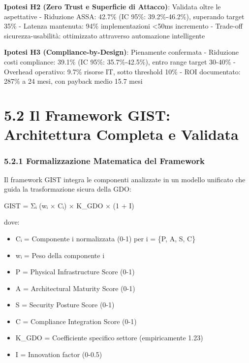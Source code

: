 \documentclass{report}
\providecommand{\tightlist}{%
  \setlength{\itemsep}{0pt}\setlength{\parskip}{0pt}
}
\begin{document}
\textbf{Ipotesi H2 (Zero Trust e Superficie di Attacco)}: Validata oltre
le aspettative - Riduzione ASSA: 42.7\% (IC 95\%: 39.2\%-46.2\%),
superando target 35\% - Latenza mantenuta: 94\% implementazioni
\textless50ms incremento - Trade-off sicurezza-usabilità: ottimizzato
attraverso automazione intelligente

\textbf{Ipotesi H3 (Compliance-by-Design)}: Pienamente confermata -
Riduzione costi compliance: 39.1\% (IC 95\%: 35.7\%-42.5\%), entro range
target 30-40\% - Overhead operativo: 9.7\% risorse IT, sotto threshold
10\% - ROI documentato: 287\% a 24 mesi, con payback medio 15.7 mesi

\section{5.2 Il Framework GIST: Architettura Completa e
Validata}\label{il-framework-gist-architettura-completa-e-validata}

\subsubsection{5.2.1 Formalizzazione Matematica del
Framework}\label{formalizzazione-matematica-del-framework}

Il framework GIST integra le componenti analizzate in un modello
unificato che guida la trasformazione sicura della GDO:

GIST = Σᵢ (wᵢ × Cᵢ) × K\_GDO × (1 + I)

dove:

\begin{itemize}
\tightlist
\item
  Cᵢ = Componente i normalizzata (0-1) per i = \{P, A, S, C\}\\
\item
  wᵢ = Peso della componente i\\
\item
  P = Physical Infrastructure Score (0-1)\\
\item
  A = Architectural Maturity Score (0-1)\\
\item
  S = Security Posture Score (0-1)\\
\item
  C = Compliance Integration Score (0-1)\\
\item
  K\_GDO = Coefficiente specifico settore (empiricamente 1.23)\\
\item
  I = Innovation factor (0-0.5)
\end{itemize}
\end{document}
